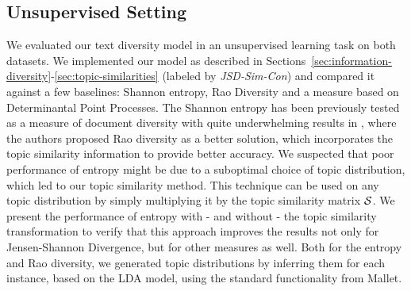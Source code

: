 \subsection{Unsupervised Setting}
\label{sec:unsupervised-learning}

We evaluated our text diversity model in an unsupervised learning task
on both datasets.
We implemented our model as described in
Sections~\ref{sec:information-diversity}-\ref{sec:topic-similarities} (labeled by {\em
    JSD-Sim-Con}) and compared it against a few 
baselines: Shannon entropy, Rao Diversity and a measure
based on Determinantal Point Processes.
The Shannon entropy has
been previously tested as a measure of document diversity with quite
underwhelming results in \cite{bache:2013}, where the authors proposed 
Rao diversity as a better solution, which incorporates the topic similarity
information to provide better accuracy. We suspected that
poor performance of entropy might be due to a suboptimal choice of
topic distribution, which led to our topic similarity
method. This technique can be used on any topic distribution
by simply multiplying it by the topic similarity matrix ${\mathcal S}$. We present the performance of entropy with - and 
without - the topic
similarity transformation to verify that this approach improves the results not
only for Jensen-Shannon Divergence, but for other measures as well.
Both for the entropy and Rao diversity, we generated topic
distributions by inferring them for each instance, based on the LDA
model, using the standard functionality from Mallet.

